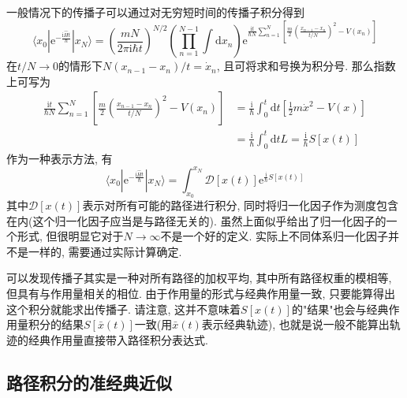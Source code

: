         \splitline

        一般情况下的传播子可以通过对无穷短时间的传播子积分得到
        \begin{equation}
            \langle x_0 | \mathrm{e}^{-\frac {\mathrm{i}\hat{H}t}{\hbar}} | x_N \rangle = \left(\frac{mN}{2\pi\mathrm{i}\hbar t}\right)^{N/2} \left(\prod_{n = 1}^{N-1}\int 
            \mathrm{d} x_n \right) \mathrm{e}^{ \frac{\mathrm{i}t}{\hbar N} \sum_{n = 1}^{N} \left[ \frac{m}{2} \left(\frac{x_{n-1} - x_n}{t/N}\right)^2 - V(x_n)\right] }
        \end{equation}
        在$t/N \to 0$的情形下$N(x_{n-1} - x_n)/t = \dot x_n$, 且可将求和号换为积分号. 那么指数上可写为
        \begin{equation}\begin{aligned}
            \frac{\mathrm{i}t}{\hbar N} \sum_{n = 1}^{N} \left[ \frac{m}{2} \left(\frac{x_{n-1} - x_n}{t/N}\right)^2 - V(x_n)\right] &= \frac{\mathrm{i}}{\hbar} \int_0^t \mathrm{d}t \left[ \frac{1}{2} m \dot x^2 - V(x) \right]\\
            &= \frac{\mathrm{i}}{\hbar} \int_0^t \mathrm{d}t L = \frac{\mathrm{i}}{\hbar} S[x(t)]
        \end{aligned}\end{equation}
        作为一种表示方法, 有\cite{费曼量子力学与路径积分}
        \begin{equation}\label{eq:8-2-1}
            \langle x_0 | \mathrm{e}^{-\frac {\mathrm{i}\hat{H}t}{\hbar}} | x_N \rangle = \int_{x_0}^{x_N} \mathcal{D}[x(t)] \mathrm{e}^{ \frac{\mathrm{i}}{\hbar} S[x(t)] }
        \end{equation}
        其中$\mathcal{D}[x(t)]$表示对所有可能的路径进行积分, 同时将归一化因子作为测度包含在内(这个归一化因子应当是与路径无关的). 虽然上面似乎给出了归一化因子的一个形式, 但很明显它对于$N \to \infty$不是一个好的定义. 实际上不同体系归一化因子并不是一样的, 需要通过实际计算确定. 

        可以发现传播子其实是一种对所有路径的加权平均, 其中所有路径权重的模相等, 但具有与作用量相关的相位. 由于作用量的形式与经典作用量一致, 只要能算得出这个积分就能求出传播子. 请注意, 这并不意味着$S[x(t)]$的"结果"也会与经典作用量积分的结果$S[\bar x(t)]$一致(用$\bar x(t)$表示经典轨迹), 也就是说一般不能算出轨迹的经典作用量直接带入路径积分表达式.

        \subsection{路径积分的准经典近似}


